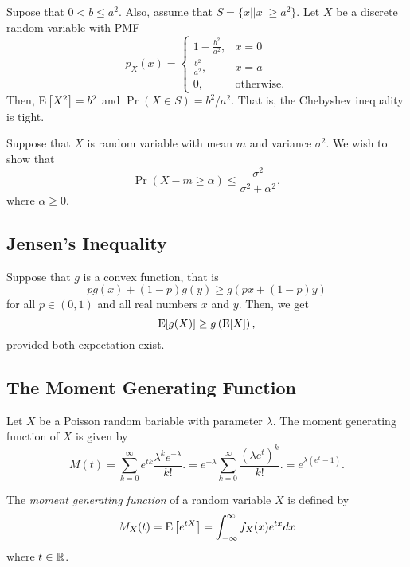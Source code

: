 \begin{example}
Supose that $0 < b \leq a^2$.
Also, assume that $S = \{ x | |x| \geq a^2 \}$.
Let $X$ be a discrete random variable with PMF
\begin{equation*}
p_X (x) = \left\{ \begin{array}{ll} 1 - \frac{b^2}{a^2}, & x = 0 \\
\frac{b^2}{a^2}, & x = a \\
0, & \text{otherwise.} \end{array} \right.
\end{equation*}
Then, $\mathrm{E} \left[ X^2 \right] = b^2$ and $\Pr (X \in S) = b^2 / a^2$.
That is, the Chebyshev inequality is tight.
\end{example}

\newpage

\begin{example}
Suppose that $X$ is random variable with mean $m$ and variance $\sigma^2$.
We wish to show that
\begin{equation*}
\Pr ( X - m \geq \alpha ) \leq \frac{\sigma^2}{\sigma^2 + \alpha^2},
\end{equation*}
where $\alpha \geq 0$.
\end{example}


\subsection{Jensen's Inequality}

Suppose that $g$ is a convex function, that is
\begin{equation*}
p g(x) + (1-p) g(y) \geq g(px + (1-p)y)
\end{equation*}
for all $p \in (0,1)$ and all real numbers $x$ and $y$.
Then, we get
\begin{equation*}
\mathrm{E} [g(X)] \geq g \left( \mathrm{E} [X] \right) ,
\end{equation*}
provided both expectation exist.

\subsection{The Moment Generating Function}


\begin{example}
Let $X$ be a Poisson random bariable with parameter $\lambda$.
The moment generating function of $X$ is given by
\begin{equation*}
M(t) = \sum_{k=0}^{\infty} e^{tk} \frac{ \lambda^k e^{-\lambda}}{k!} .
= e^{-\lambda} \sum_{k=0}^{\infty} \frac{\left( \lambda e^t \right)^k}{k!} .
= e^{\lambda(e^t -1)} .
\end{equation*}

\end{example}
The \emph{moment generating function} of a random variable $X$ is defined by
\begin{equation*}
M_X (t) = \mathrm{E} \left[ e^{t X} \right]
= \int_{-\infty}^{\infty} f_X (x) e^{t x} dx
\end{equation*}
where $t \in \mathbb{R}$.



